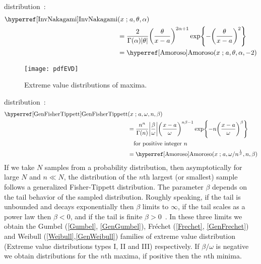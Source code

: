  distribution~\cite{Louzada2018a}:
\begin{align}
\label{InvNakagami}
 \opr{InvNakagami}&(x \given a, \theta, \alpha) 
\\ \notag 
& =
 \frac{2}{\Gamma(\alpha) |\theta| }
\Left(\frac{\theta}{x-a}\Right)^{2\alpha+1}
\exp \Left\{
-  \Left(\frac{\theta}{x-a}\Right)^{2}
\Right\}
\\ \notag
& = \opr{Amoroso}(x\given a,\theta, \alpha, -2)
\notag
\end{align}




\label{SecExtremeOrderStatistic}


\begin{figure}[t]
\begin{center}
\texttt{[image: pdfEVD]}
\end{center}
\caption{Extreme value distributions of maxima.}
\end{figure}



 distribution~\cite{Smirnov1949,Barndorff-Nielsen1963}:
\begin{align}
\label{GenFisherTippett}  
 \opr{GenFisherTippett}&(x\given  a, \omega, n, \beta) 
\notag
\\ \notag
&=
\frac{n^n}{\Gamma(n)} 
\Left|\frac{\beta}{\omega}\Right|
\Left(\frac{x-a}{\omega}\Right)^{n \beta -1}
\exp \Left\{
-  n \Left(\frac{x-a}{\omega}\Right)^{\beta}
\Right\} \checked
\\
& \quad \text{for positive integer } n
\\ \notag
& = \opr{Amoroso}(x\given a,{\omega}/{n^{\frac{1}{\beta} }},n,\beta) \checked
\end{align}
If we take $N$ samples from a probability distribution, then asymptotically for large $N$ and $n\ll N$, the distribution of the $n$th largest (or smallest) sample follows a generalized Fisher-Tippett distribution. The parameter $\beta$ depends on the tail behavior of the sampled distribution. Roughly speaking, if the tail is unbounded and decays exponentially then $\beta$ limits to $\infty$, if the tail scales as a power law then $\beta<0$,  and if the tail is finite $\beta>0$~\cite{Gumbel1958}. In these three limits we obtain the Gumbel (\ref{Gumbel}, \ref{GenGumbel}), Fr\'{e}chet (\ref{Frechet}, \ref{GenFrechet}) and Weibull (\ref{Weibull},\ref{GenWeibull}) families of extreme value distribution (Extreme value distributions types I, II and III) respectively. If $\beta/\omega$ is negative we obtain distributions for the $n$th maxima, if positive then the $n$th minima.

